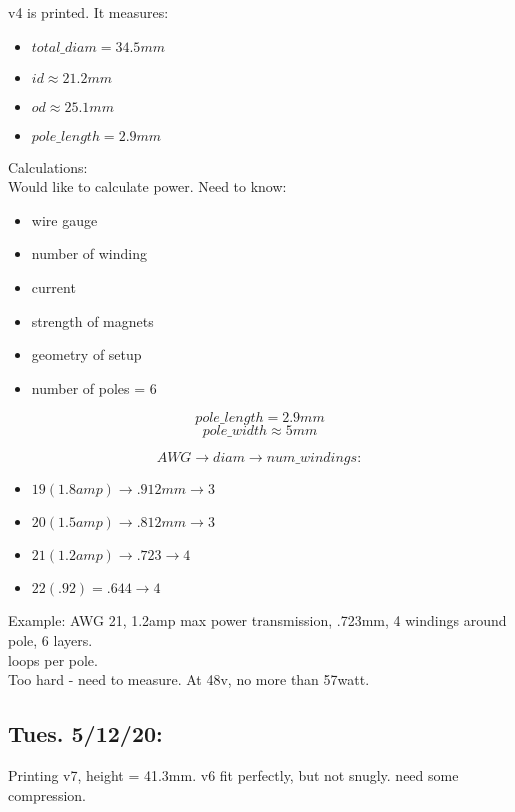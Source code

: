\documentclass[11pt]{article} %
\begin{document}
\noindent  v4 is printed. It measures: \\

\begin{itemize}
\item $total\_diam = 34.5mm$
\item $id \approx 21.2mm$
\item $od \approx 25.1mm$
\item $pole\_length = 2.9mm$
\end{itemize}


\noindent Calculations: \\

\noindent Would like to calculate power. Need to know: \\

\begin{itemize}
\item wire gauge
\item number of winding
\item current
\item strength of magnets
\item geometry of setup
\item number of poles = 6
\end{itemize}

$$pole\_length = 2.9mm$$
$$pole\_width \approx 5mm$$

$$AWG \rightarrow diam \rightarrow num\_windings:$$

\begin{itemize}
\item $19 (1.8amp) \rightarrow .912mm \rightarrow 3$
\item $20 (1.5amp) \rightarrow .812mm \rightarrow 3$
\item $21 (1.2amp) \rightarrow .723 \rightarrow 4$
\item $22 (.92) = .644 \rightarrow 4$
\end{itemize}

\noindent Example: AWG 21, 1.2amp max power transmission, .723mm, 4 windings around pole, 6 layers. \\

 loops per pole. \\

\noindent Too hard - need to measure. At 48v, no more than 57watt. \\

\subsection*{Tues. 5/12/20:} Printing v7, height = 41.3mm. v6 fit perfectly, but not snugly. need some compression. \\
\end{document}
